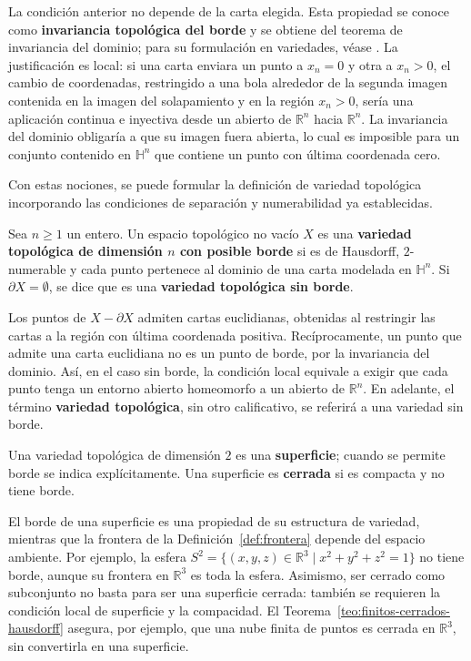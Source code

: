 La condición anterior no depende de la carta elegida. Esta propiedad se conoce como \textbf{invariancia topológica del borde} y se obtiene del teorema de invariancia del dominio; para su formulación en variedades, véase \cite[Teorema~2.59]{lee_topological_manifolds_2011}. La justificación es local: si una carta enviara un punto a $x_n=0$ y otra a $x_n>0$, el cambio de coordenadas, restringido a una bola alrededor de la segunda imagen contenida en la imagen del solapamiento y en la región $x_n>0$, sería una aplicación continua e inyectiva desde un abierto de $\mathbb{R}^n$ hacia $\mathbb{R}^n$. La invariancia del dominio obligaría a que su imagen fuera abierta, lo cual es imposible para un conjunto contenido en $\mathbb{H}^n$ que contiene un punto con última coordenada cero.

Con estas nociones, se puede formular la definición de variedad topológica incorporando las condiciones de separación y numerabilidad ya establecidas.

\begin{definition}
\label{def:variedad-topologica}
Sea $n\geq1$ un entero. Un espacio topológico no vacío $X$ es una \textbf{variedad topológica de dimensión $n$ con posible borde} si es de Hausdorff, $2$-numerable y cada punto pertenece al dominio de una carta modelada en $\mathbb{H}^n$. Si $\partial X=\emptyset$, se dice que es una \textbf{variedad topológica sin borde}.
\end{definition}

Los puntos de $X-\partial X$ admiten cartas euclidianas, obtenidas al restringir las cartas a la región con última coordenada positiva. Recíprocamente, un punto que admite una carta euclidiana no es un punto de borde, por la invariancia del dominio. Así, en el caso sin borde, la condición local equivale a exigir que cada punto tenga un entorno abierto homeomorfo a un abierto de $\mathbb{R}^n$. En adelante, el término \textbf{variedad topológica}, sin otro calificativo, se referirá a una variedad sin borde.

\begin{definition}[Superficie]
\label{def:superficie}
Una variedad topológica de dimensión $2$ es una \textbf{superficie}; cuando se permite borde se indica explícitamente. Una superficie es \textbf{cerrada} si es compacta y no tiene borde.
\end{definition}

El borde de una superficie es una propiedad de su estructura de variedad, mientras que la frontera de la Definición~\ref{def:frontera} depende del espacio ambiente. Por ejemplo, la esfera $S^2=\{(x,y,z)\in\mathbb{R}^3\mid x^2+y^2+z^2=1\}$ no tiene borde, aunque su frontera en $\mathbb{R}^3$ es toda la esfera. Asimismo, ser cerrado como subconjunto no basta para ser una superficie cerrada: también se requieren la condición local de superficie y la compacidad. El Teorema~\ref{teo:finitos-cerrados-hausdorff} asegura, por ejemplo, que una nube finita de puntos es cerrada en $\mathbb{R}^3$, sin convertirla en una superficie.

